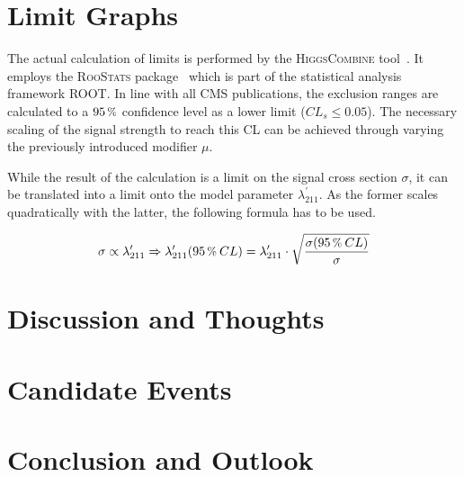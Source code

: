 \section{Limit Graphs}
\label{sec:limit-graphs}

The actual calculation of limits is performed by the \textsc{HiggsCombine} tool~\cite{clsmod,higgscombine}. It employs the \textsc{RooStats} package~\cite{roostats} which is part of the statistical analysis framework \textsc{ROOT}. In line with all CMS publications, the exclusion ranges are calculated to a $95\,\pct$ confidence level as a lower limit ($CL_s \leq 0.05$). The necessary scaling of the signal strength to reach this CL can be achieved through varying the previously introduced modifier $\mu$.

While the result of the calculation is a limit on the signal cross section $\sigma$, it can be translated into a limit onto the model parameter $\lambda^\prime_{211}$. As the former scales quadratically with the latter, the following formula has to be used.

\begin{equation}
  \label{eq:xs-lambda-scale}
  \sigma \propto \lambda^\prime_{211} \Rightarrow \lambda^\prime_{211} (95\,\pct\: CL) = \lambda^\prime_{211} \cdot \sqrt{ \frac{\sigma (95\,\pct\: CL)}{\sigma} } 
\end{equation}




\section{Discussion and Thoughts}
\label{sec:discussion}



\section{Candidate Events}
\label{sec:candidate-events}


\section{Conclusion and Outlook}
\label{sec:conclusion}




